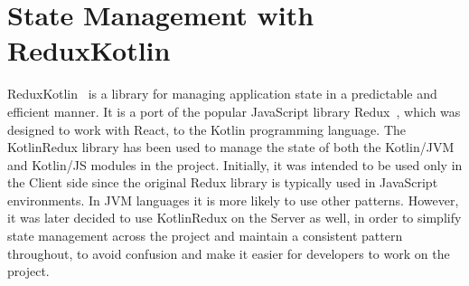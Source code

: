 \section{State Management with ReduxKotlin}
\label{sec:state-management-with-reduxkotlin}
ReduxKotlin~\cite{ReduxKot86:online} is a library for managing application state in a predictable and efficient manner. It is a port of the popular JavaScript library Redux~\cite{ReduxApr44:online}, which was designed to work with React, to the Kotlin programming language. The KotlinRedux library has been used to manage the state of both the Kotlin/JVM and Kotlin/JS modules in the project. Initially, it was intended to be used only in the Client side since the original Redux library is typically used in JavaScript environments. In JVM languages it is more likely to use other patterns. However, it was later decided to use KotlinRedux on the Server as well, in order to simplify state management across the project and maintain a consistent pattern throughout, to avoid confusion and make it easier for developers to work on the project.

